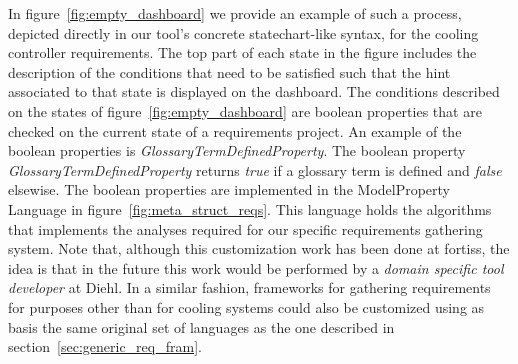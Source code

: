 In figure~\ref{fig:empty_dashboard} we provide an example of such a process,
depicted directly in our tool's concrete statechart-like syntax, for the cooling
controller requirements. The top part of each state in the figure includes the description
of the conditions that need to be satisfied such that the hint associated to
that state is displayed on the dashboard. The conditions described on the states
of figure~\ref{fig:empty_dashboard} are boolean properties that are checked on
the current state of a requirements project. An example of the boolean
properties is \emph{GlossaryTermDefinedProperty}. The boolean property
\emph{GlossaryTermDefinedProperty} returns \emph{true} if a glossary term is
defined and \emph{false} elsewise. The boolean properties are implemented in the
\textsf{ModelProperty} Language in figure~\ref{fig:meta_struct_reqs}. This language holds the algorithms that implements the analyses required for our specific requirements gathering system.
Note that, although this customization work has been done at fortiss, the idea
is that in the future this work would be performed by a \emph{domain specific
tool developer} at Diehl. In a similar fashion, frameworks for gathering
requirements for purposes other than for cooling systems could also be
customized using as basis the same original set of languages as the one
described in section~\ref{sec:generic_req_fram}.
\vspace{-.3cm}




